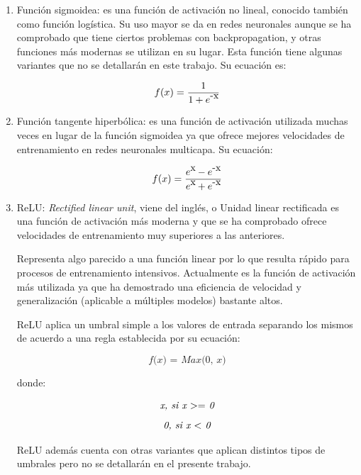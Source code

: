\documentclass[a4paper,12pt,oneside,spanish]{book}
\begin{document}
\begin{enumerate}
	\item Función sigmoidea: es una función de activación no lineal, conocido también como función logística. Su uso mayor se da en redes neuronales aunque se ha comprobado que tiene ciertos problemas con backpropagation, y otras funciones más modernas se utilizan en su lugar. Esta función tiene algunas variantes que no se detallarán en este trabajo. Su ecuación es:\par 
	
	\begin{equation}
	f(x) = \frac{1}{1 + e\raisebox{1ex}{-x}} 
	\end{equation}

	\item Función tangente hiperbólica: es una función de activación utilizada muchas veces en lugar de la función sigmoidea ya que ofrece mejores velocidades de entrenamiento en redes neuronales multicapa. Su ecuación:\par 

	\begin{equation}
	f(x) = \frac{e\raisebox{1ex}{x} - e\raisebox{1ex}{-x}}{e\raisebox{1ex}{x} + e\raisebox{1ex}{-x}} 
	\end{equation}

	\item ReLU: \textit{Rectified linear unit}, viene del inglés, o Unidad linear rectificada es una función de activación más moderna y que se ha comprobado ofrece velocidades de entrenamiento muy superiores a las anteriores. \par 
	Representa algo parecido a una función linear por lo que resulta rápido para procesos de entrenamiento intensivos. Actualmente es la función de activación más utilizada ya que ha demostrado una eficiencia de velocidad y  generalización (aplicable a múltiples modelos) bastante altos.\par 
	
	ReLU aplica un umbral simple a los valores de entrada separando los mismos de acuerdo a una regla establecida por su ecuación:\par 

	\[ \textit{f(x) = Max(0, x)} \]
	
	donde:
	
	\[ \textit{x, si x $ >= $ 0} \]
	\[ \textit{0, si x $ < $ 0} \]

	ReLU además cuenta con otras variantes que aplican distintos tipos de umbrales pero no se detallarán en el presente trabajo.\par 
\end{enumerate}	
\end{document}
